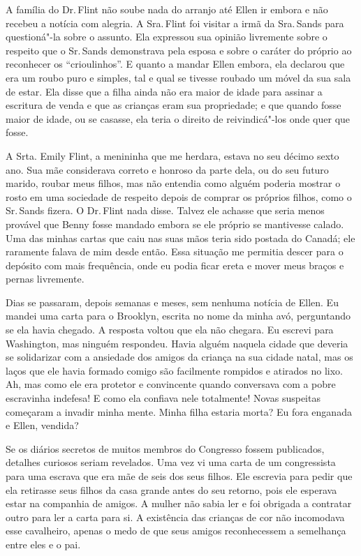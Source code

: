 A família do Dr.\,Flint não soube nada
do arranjo até Ellen ir embora e não recebeu a notícia com alegria. A
Sra.\,Flint foi visitar a irmã da Sra.\,Sands para questioná"-la sobre o
assunto. Ela expressou sua opinião livremente sobre o respeito que o Sr.\,Sands demonstrava pela esposa e sobre o caráter do próprio ao reconhecer
os ``crioulinhos''. E quanto a mandar Ellen embora, ela declarou que era
um roubo puro e simples, tal e qual se tivesse roubado um móvel da sua
sala de estar. Ela disse que a filha ainda não era maior de idade para
assinar a escritura de venda e que as crianças eram sua propriedade; e
que quando fosse maior de idade, ou se casasse, ela teria o direito de
reivindicá"-los onde quer que fosse.

A Srta. Emily Flint, a menininha que me
herdara, estava no seu décimo sexto ano. Sua mãe considerava correto e
honroso da parte dela, ou do seu futuro marido, roubar meus filhos, mas
não entendia como alguém poderia mostrar o rosto em uma sociedade de
respeito depois de comprar os próprios filhos, como o Sr.\,Sands fizera.
O Dr.\,Flint nada disse. Talvez ele achasse que seria menos provável que
Benny fosse mandado embora se ele próprio se mantivesse calado. Uma das
minhas cartas que caiu nas suas mãos teria sido postada do Canadá; ele
raramente falava de mim desde então. Essa situação me permitia descer
para o depósito com mais frequência, onde eu podia ficar ereta e mover
meus braços e pernas livremente.

Dias se passaram, depois semanas e
meses, sem nenhuma notícia de Ellen. Eu mandei uma carta para o
Brooklyn, escrita no nome da minha avó, perguntando se ela havia
chegado. A resposta voltou que ela não chegara. Eu escrevi para
Washington, mas ninguém respondeu. Havia alguém naquela cidade que
deveria se solidarizar com a ansiedade dos amigos da criança na sua
cidade natal, mas os laços que ele havia formado comigo são facilmente
rompidos e atirados no lixo. Ah, mas como ele era protetor e convincente
quando conversava com a pobre escravinha indefesa! E como ela confiava
nele totalmente! Novas suspeitas começaram a invadir minha mente. Minha
filha estaria morta? Eu fora enganada e Ellen, vendida?

Se os diários secretos de muitos
membros do Congresso fossem publicados, detalhes curiosos seriam
revelados. Uma vez vi uma carta de um congressista para uma escrava que
era mãe de seis dos seus filhos. Ele escrevia para pedir que ela
retirasse seus filhos da casa grande antes do seu retorno, pois ele
esperava estar na companhia de amigos. A mulher não sabia ler e foi
obrigada a contratar outro para ler a carta para si. A existência das
crianças de cor não incomodava esse cavalheiro, apenas o medo de que
seus amigos reconhecessem a semelhança entre eles e o pai.

